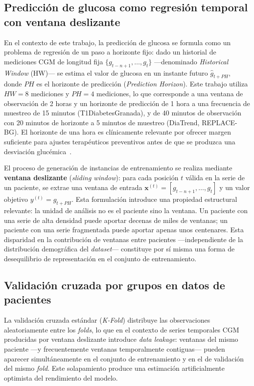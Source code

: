 \subsection{Predicción de glucosa como regresión temporal con ventana deslizante}
\label{subsec:prediccion_glucosa_formulacion}

En el contexto de este trabajo, la predicción de glucosa se formula como un problema de regresión de un paso a horizonte fijo: dado un historial de mediciones CGM de longitud fija $\{g_{t-n+1}, \ldots, g_t\}$ —denominado \emph{Historical Window} (HW)— se estima el valor de glucosa en un instante futuro $\hat{g}_{t+PH}$, donde $PH$ es el horizonte de predicción (\emph{Prediction Horizon}). Este trabajo utiliza $HW = 8$ mediciones y $PH = 4$ mediciones, lo que corresponde a una ventana de observación de 2 horas y un horizonte de predicción de 1 hora a una frecuencia de muestreo de 15 minutos (T1DiabetesGranada), y de 40 minutos de observación con 20 minutos de horizonte a 5 minutos de muestreo (DiaTrend, REPLACE-BG). El horizonte de una hora es clínicamente relevante por ofrecer margen suficiente para ajustes terapéuticos preventivos antes de que se produzca una desviación glucémica~\cite{sparacino2007glucose}.

El proceso de generación de instancias de entrenamiento se realiza mediante \textbf{ventana deslizante} (\emph{sliding window}): para cada posición $t$ válida en la serie de un paciente, se extrae una ventana de entrada $\mathbf{x}^{(t)} = [g_{t-n+1}, \ldots, g_t]$ y un valor objetivo $y^{(t)} = g_{t+PH}$. Esta formulación introduce una propiedad estructural relevante: la unidad de análisis no es el paciente sino la ventana. Un paciente con una serie de alta densidad puede aportar decenas de miles de ventanas; un paciente con una serie fragmentada puede aportar apenas unos centenares. Esta disparidad en la contribución de ventanas entre pacientes —independiente de la distribución demográfica del \emph{dataset}— constituye por sí misma una forma de desequilibrio de representación en el conjunto de entrenamiento.

\subsection{Validación cruzada por grupos en datos de pacientes}
\label{subsec:group_kfold}

La validación cruzada estándar (\emph{K-Fold}) distribuye las observaciones aleatoriamente entre los \emph{folds}, lo que en el contexto de series temporales CGM producidas por ventana deslizante introduce \emph{data leakage}: ventanas del mismo paciente —y frecuentemente ventanas temporalmente contiguas— pueden aparecer simultáneamente en el conjunto de entrenamiento y en el de validación del mismo \emph{fold}. Este solapamiento produce una estimación artificialmente optimista del rendimiento del modelo.

